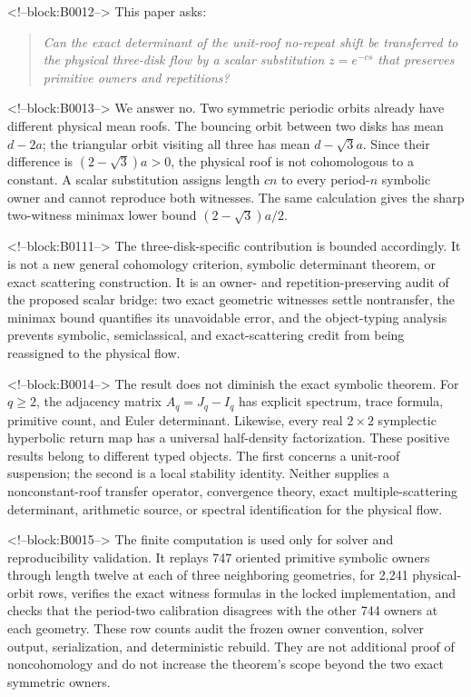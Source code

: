 \documentclass[11pt,a4paper]{article}
\theoremstyle{definition}
\theoremstyle{remark}
\begin{document}
<!--block:B0012-->
This paper asks:
\begin{quote}
\emph{Can the exact determinant of the unit-roof no-repeat shift be transferred to the physical three-disk flow by a scalar substitution \(z=e^{-cs}\) that preserves primitive owners and repetitions?}
\end{quote}

<!--block:B0013-->
We answer no. Two symmetric periodic orbits already have different physical mean roofs. The bouncing orbit between two disks has mean \(d-2a\); the triangular orbit visiting all three has mean \(d-\sqrt3a\). Since their difference is \((2-\sqrt3)a>0\), the physical roof is not cohomologous to a constant. A scalar substitution assigns length \(cn\) to every period-\(n\) symbolic owner and cannot reproduce both witnesses. The same calculation gives the sharp two-witness minimax lower bound \((2-\sqrt3)a/2\).

<!--block:B0111-->
The three-disk-specific contribution is bounded accordingly. It is not a new general cohomology criterion, symbolic determinant theorem, or exact scattering construction. It is an owner- and repetition-preserving audit of the proposed scalar bridge: two exact geometric witnesses settle nontransfer, the minimax bound quantifies its unavoidable error, and the object-typing analysis prevents symbolic, semiclassical, and exact-scattering credit from being reassigned to the physical flow.

<!--block:B0014-->
The result does not diminish the exact symbolic theorem. For \(q\ge2\), the adjacency matrix \(A_q=J_q-I_q\) has explicit spectrum, trace formula, primitive count, and Euler determinant. Likewise, every real \(2\times2\) symplectic hyperbolic return map has a universal half-density factorization. These positive results belong to different typed objects. The first concerns a unit-roof suspension; the second is a local stability identity. Neither supplies a nonconstant-roof transfer operator, convergence theory, exact multiple-scattering determinant, arithmetic source, or spectral identification for the physical flow.

<!--block:B0015-->
The finite computation is used only for solver and reproducibility validation. It replays 747 oriented primitive symbolic owners through length twelve at each of three neighboring geometries, for 2,241 physical-orbit rows, verifies the exact witness formulas in the locked implementation, and checks that the period-two calibration disagrees with the other 744 owners at each geometry. These row counts audit the frozen owner convention, solver output, serialization, and deterministic rebuild. They are not additional proof of noncohomology and do not increase the theorem's scope beyond the two exact symmetric owners.
\end{document}
